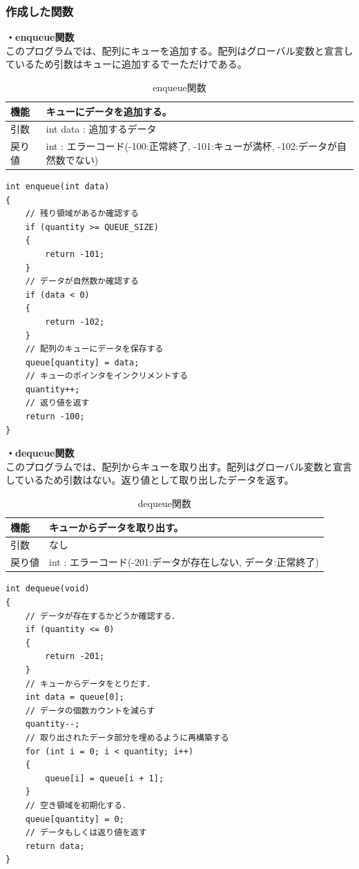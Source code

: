 \documentclass[dvipdfmx]{jsarticle}
\begin{document}
\subsubsection{作成した関数}
\textbf{・enqueue関数}\\
このプログラムでは、配列にキューを追加する。配列はグローバル変数と宣言しているため引数はキューに追加するでーただけである。
\begin{table}[ht]
  \centering
  \caption{enqueue関数}
  \begin{tabular}{|p{5cm}|p{10cm}|}
    \hline
    機能  & キューにデータを追加する。                                      \\
    \hline
    引数  & int data : 追加するデータ \\
    \hline
    戻り値 & int : エラーコード(-100:正常終了, -101:キューが満杯, -102:データが自然数でない) \\
    \hline
  \end{tabular}
  \label{tab:enqueue_func}
\end{table}
\begin{lstlisting}[caption={enqueue関数}, label={lst:enqueue_func}]
int enqueue(int data)
{
    // 残り領域があるか確認する
    if (quantity >= QUEUE_SIZE)
    {
        return -101;
    }
    // データが自然数か確認する
    if (data < 0)
    {
        return -102;
    }
    // 配列のキューにデータを保存する
    queue[quantity] = data;
    // キューのポインタをインクリメントする
    quantity++;
    // 返り値を返す
    return -100;
}
\end{lstlisting}
\textbf{・dequeue関数}\\
このプログラムでは、配列からキューを取り出す。配列はグローバル変数と宣言しているため引数はない。返り値として取り出したデータを返す。
\begin{table}[ht]
  \centering
  \caption{dequeue関数}
  \begin{tabular}{|p{5cm}|p{10cm}|}
    \hline
    機能  & キューからデータを取り出す。                                      \\
    \hline
    引数  & なし \\
    \hline
    戻り値 & int : エラーコード(-201:データが存在しない, データ:正常終了) \\
    \hline
  \end{tabular}
  \label{tab:dequeue_func}
\end{table}
\begin{lstlisting}[caption={dequeue関数}, label={lst:dequeue_func}]
int dequeue(void)
{
    // データが存在するかどうか確認する．
    if (quantity <= 0)
    {
        return -201;
    }
    // キューからデータをとりだす．
    int data = queue[0];
    // データの個数カウントを減らす
    quantity--;
    // 取り出されたデータ部分を埋めるように再構築する
    for (int i = 0; i < quantity; i++)
    {
        queue[i] = queue[i + 1];
    }
    // 空き領域を初期化する．
    queue[quantity] = 0;
    // データもしくは返り値を返す
    return data;
}
\end{lstlisting}
\end{document}
